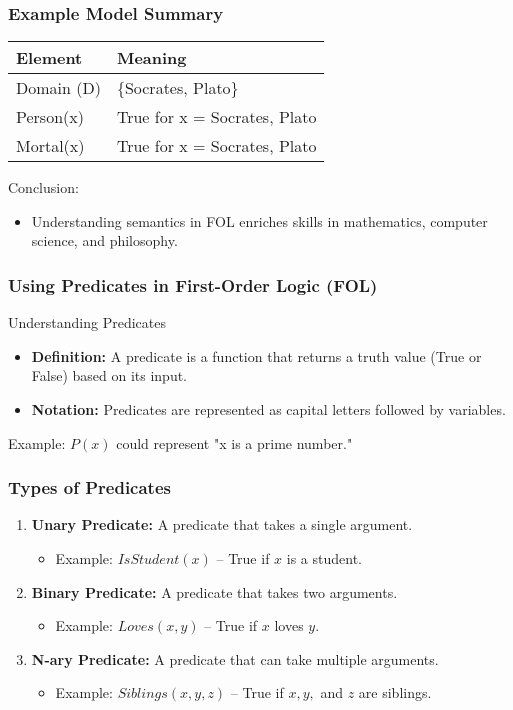 \documentclass[aspectratio=169]{beamer}
\begin{document}
\begin{frame}[fragile]
    \frametitle{Example Model Summary}
    \begin{tabular}{|l|l|}
        \hline
        \textbf{Element} & \textbf{Meaning} \\
        \hline
        Domain (D) & \{Socrates, Plato\} \\
        \hline
        Person(x) & True for x = Socrates, Plato \\
        \hline
        Mortal(x) & True for x = Socrates, Plato \\
        \hline
    \end{tabular}
    
    Conclusion:
    \begin{itemize}
        \item Understanding semantics in FOL enriches skills in mathematics, computer science, and philosophy.
    \end{itemize}
\end{frame}

\begin{frame}[fragile]
    \frametitle{Using Predicates in First-Order Logic (FOL)}
    \begin{block}{Understanding Predicates}
        \begin{itemize}
            \item \textbf{Definition:} A predicate is a function that returns a truth value (True or False) based on its input. 
            \item \textbf{Notation:} Predicates are represented as capital letters followed by variables. 
        \end{itemize}
    \end{block}
    Example: $P(x)$ could represent "x is a prime number."
\end{frame}

\begin{frame}[fragile]
    \frametitle{Types of Predicates}
    \begin{enumerate}
        \item \textbf{Unary Predicate:} A predicate that takes a single argument.
            \begin{itemize}
                \item Example: $IsStudent(x)$ – True if $x$ is a student.
            \end{itemize}
        \item \textbf{Binary Predicate:} A predicate that takes two arguments.
            \begin{itemize}
                \item Example: $Loves(x, y)$ – True if $x$ loves $y$.
            \end{itemize}
        \item \textbf{N-ary Predicate:} A predicate that can take multiple arguments.
            \begin{itemize}
                \item Example: $Siblings(x, y, z)$ – True if $x, y,$ and $z$ are siblings.
            \end{itemize}
    \end{enumerate}
\end{frame}
\end{document}
